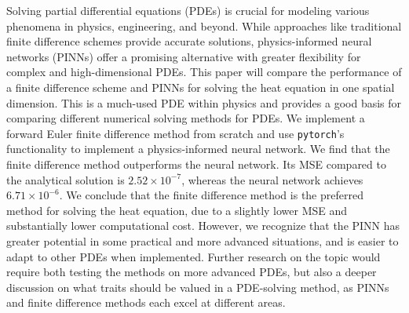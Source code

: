 Solving partial differential equations (PDEs) is crucial for modeling various phenomena in physics, engineering, and beyond.
While approaches like traditional finite difference schemes provide accurate solutions, physics-informed neural networks (PINNs) offer a promising alternative with greater flexibility for complex and high-dimensional PDEs.
This paper will compare the performance of a finite difference scheme and PINNs for solving the heat equation in one spatial dimension.
This is a much-used PDE within physics and provides a good basis for comparing different numerical solving methods for PDEs.
We implement a forward Euler finite difference method from scratch and use \texttt{pytorch}'s functionality to implement a physics-informed neural network.
We find that the finite difference method outperforms the neural network. 
Its MSE compared to the analytical solution is $2.52 \times 10^{-7}$, whereas the neural network achieves $ 6.71 \times 10^{-6}$. 
We conclude that the finite difference method is the preferred method for solving the heat equation, due to a slightly lower MSE and substantially lower computational cost.
However, we recognize that the PINN has greater potential in some practical and more advanced situations, and is easier to adapt to other PDEs when implemented.
Further research on the topic would require both testing the methods on more advanced PDEs, but also a deeper discussion on what traits should be valued in a PDE-solving method, as PINNs and finite difference methods each excel at different areas.